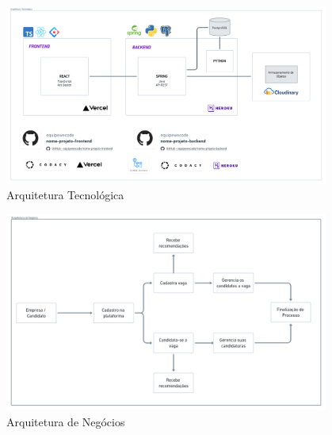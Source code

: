 \begin{figure}[htb]
	\centering
	\caption{\label{fig_arq_tec}Arquitetura Tecnológica}
	\includegraphics[width=0.95\textwidth]{../Figuras/arq-proj-arq-tec.png}
\end{figure}

\begin{figure}[htb]
	\centering
	\caption{\label{fig_arq_negocio}Arquitetura de Negócios}
	\includegraphics[width=0.95\textwidth]{../Figuras/arq-proj-arq-negocio.png}
\end{figure}